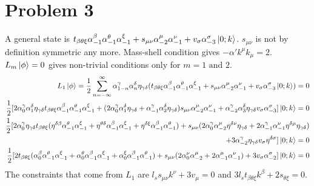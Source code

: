 \documentclass[12pt]{article}
\begin{document}
\section{Problem 3}
A general state is $t_{\beta\theta\xi}\alpha_{-1}^\beta\alpha_{-1}^\theta\alpha_{-1}^\xi+s_{\mu\nu}\alpha_{-2}^\mu\alpha_{-1}^\nu+v_\sigma\alpha_{-3}^\sigma\ket{0;k}$. $s_{\mu\nu}$ is not by definition symmetric any more. Mass-shell condition gives $-\alpha' k^\mu k_\mu=2$. $L_m\ket{\phi}=0$ gives non-trivial conditions only for $m=1\text{ and }2$.
\begin{equation}
\begin{aligned}[t]
L_1\ket{\phi}=\frac{1}{2}\sum\limits_{n=-\infty}^\infty \alpha_{1-n}^\gamma\alpha_n^\delta\eta_{\gamma\delta}(t_{\beta\theta\xi}\alpha_{-1}^\beta\alpha_{-1}^\theta\alpha_{-1}^\xi+s_{\mu\nu}\alpha_{-2}^\mu\alpha_{-1}^\nu+v_\sigma\alpha_{-3}^\sigma\ket{0;k})=0\\
\frac{1}{2}[2\alpha_{0}^\gamma\alpha_1^\delta\eta_{\gamma\delta}t_{\beta\theta\xi}\alpha_{-1}^\beta\alpha_{-1}^\theta\alpha_{-1}^\xi+(2\alpha_{0}^\gamma\alpha_1^\delta\eta_{\gamma\delta}+\alpha_{-1}^\gamma\alpha_2^\delta\eta_{\gamma\delta})s_{\mu\nu}\alpha_{-2}^\mu\alpha_{-1}^\nu+\alpha_{-2}^\gamma\alpha_3^\delta\eta_{\gamma\delta}v_\sigma\alpha_{-3}^\sigma]\ket{0;k}=0\\
\frac{1}{2}[2\alpha_{0}^\gamma\eta_{\gamma\delta}t_{\beta\theta\xi}(\eta^{\delta\beta}\alpha_{-1}^\theta\alpha_{-1}^\xi+\eta^{\theta\delta}\alpha_{-1}^\beta\alpha_{-1}^\xi+\eta^{\delta\xi}\alpha_{-1}^\beta\alpha_{-1}^\theta)+s_{\mu\nu}(2\alpha_{0}^\gamma\alpha_{-2}^\mu\eta^{\delta\nu}\eta_{\gamma\delta}+2\alpha_{-1}^\gamma\alpha_{-1}^\nu\eta^{\delta\mu}\eta_{\gamma\delta})\\
+3\alpha_{-2}^\gamma\eta_{\gamma\delta}v_\sigma\eta^{\delta\sigma}]\ket{0;k}=0\\
\frac{1}{2}[2t_{\beta\theta\xi}(\alpha_{0}^\beta\alpha_{-1}^\theta\alpha_{-1}^\xi+\alpha_{0}^\theta\alpha_{-1}^\beta\alpha_{-1}^\xi+\alpha_{0}^\xi\alpha_{-1}^\beta\alpha_{-1}^\theta)+s_{\mu\nu}(2\alpha_{0}^\nu\alpha_{-2}^\mu+2\alpha_{-1}^\mu\alpha_{-1}^\nu)+3v_\sigma\alpha_{-2}^\sigma]\ket{0;k}=0
\end{aligned}
\end{equation}
The constraints that come from $L_1$ are $l_s s_{\mu\nu}k^{\nu}+3v_\mu=0$ and $3l_s t_{\beta\theta\xi}k^\beta+2s_{\theta\xi}=0$.
\end{document}
